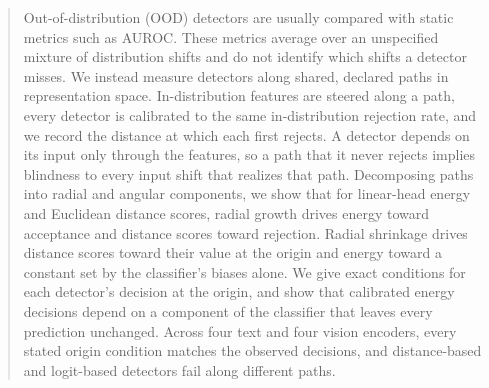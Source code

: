 \documentclass[twoside]{article}
\begin{document}
%

%


\begin{abstract}
Out-of-distribution (OOD) detectors are usually compared with static
metrics such as AUROC. These metrics average over an unspecified mixture
of distribution shifts and do not identify which shifts a detector misses.
We instead measure detectors along shared, declared paths in
representation space. In-distribution features are steered along a path,
every detector is calibrated to the same in-distribution rejection rate,
and we record the distance at which each first rejects. A detector depends
on its input only through the features, so a path that it never rejects
implies blindness to every input shift that realizes that path.
Decomposing paths into radial and angular components, we show that for
linear-head energy and Euclidean distance scores, radial growth drives
energy toward acceptance and distance scores toward rejection. Radial
shrinkage drives distance scores toward their value at the origin and
energy toward a constant set by the classifier's biases alone. We give
exact conditions for each detector's decision at the origin, and show that
calibrated energy decisions depend on a component of the classifier that
leaves every prediction unchanged. Across four text and four vision
encoders, every stated origin condition matches the observed decisions,
and distance-based and logit-based detectors fail along different paths.
\end{abstract}
\end{document}
